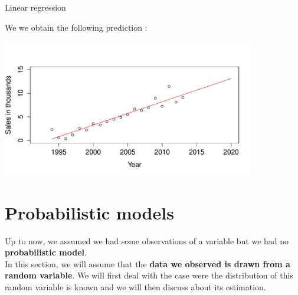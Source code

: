 \documentclass{beamer}
\begin{document}
\begin{frame}{Linear regression}
 \\
\begin{example}
We we obtain the following prediction :
\begin{center}
\includegraphics[height=6cm]{figures/3_pred}
\end{center}
\end{example}
\end{frame}

\section{Probabilistic models}

\begin{frame}{}
Up to now, we assumed we had some observations of a variable but we had no \textbf{probabilistic model}.\\
\vspace{5mm}
In this section, we will assume that the \textbf{data we observed is drawn from a random variable}. We will first deal with the case were the distribution of this random variable is known and we will then discuss about its estimation.
\end{frame}
\end{document}
